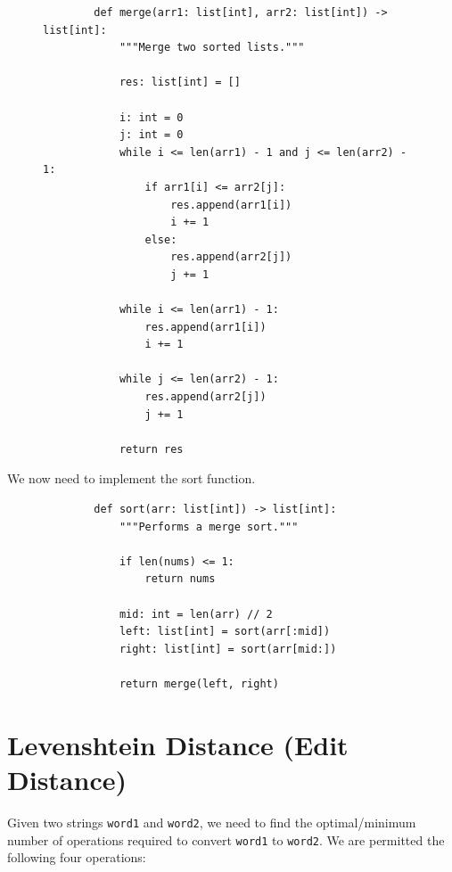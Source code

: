\documentclass[11pt]{article}
\begin{document}
\begin{figure}[H]
    \centering
    \begin{verbatim}
        def merge(arr1: list[int], arr2: list[int]) -> list[int]:
            """Merge two sorted lists."""

            res: list[int] = []

            i: int = 0
            j: int = 0
            while i <= len(arr1) - 1 and j <= len(arr2) - 1:
                if arr1[i] <= arr2[j]:
                    res.append(arr1[i])
                    i += 1
                else:
                    res.append(arr2[j])
                    j += 1
            
            while i <= len(arr1) - 1:
                res.append(arr1[i])
                i += 1

            while j <= len(arr2) - 1:
                res.append(arr2[j])
                j += 1

            return res
    \end{verbatim}
\end{figure}

We now need to implement the sort function.


\begin{figure}[H]
    \centering
    \begin{verbatim}
        def sort(arr: list[int]) -> list[int]:
            """Performs a merge sort."""

            if len(nums) <= 1:
                return nums
            
            mid: int = len(arr) // 2
            left: list[int] = sort(arr[:mid])
            right: list[int] = sort(arr[mid:])

            return merge(left, right)
    \end{verbatim}
\end{figure}


\newpage

\section{Levenshtein Distance (Edit Distance)}

Given two strings \texttt{word1} and \texttt{word2}, we
need to find the optimal/minimum number of operations required to convert
\texttt{word1} to \texttt{word2}. We are permitted the
following four operations:
\end{document}
